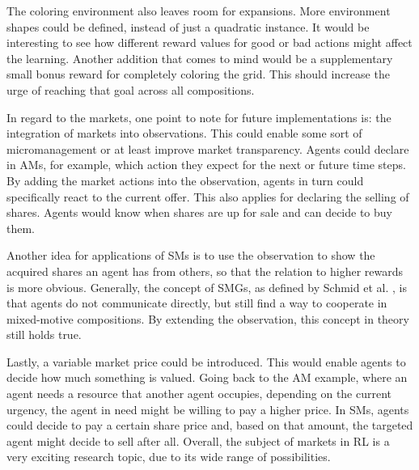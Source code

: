 The coloring environment also leaves room for expansions. More environment shapes could be defined, instead of just a quadratic instance. It would be interesting to see how different reward values for good or bad actions might affect the learning. Another addition that comes to mind would be a supplementary small bonus reward for completely coloring the grid. This should increase the urge of reaching that goal across all compositions.

In regard to the markets, one point to note for future implementations is: the integration of markets into observations. This could enable some sort of micromanagement or at least improve market transparency. Agents could declare in AMs, for example, which action they expect for the next or future time steps. By adding the market actions into the observation, agents in turn could specifically react to the current offer. This also applies for declaring the selling of shares. Agents would know when shares are up for sale and can decide to buy them. 

Another idea for applications of SMs is to use the observation to show the acquired shares an agent has from others, so that the relation to higher rewards is more obvious. Generally, the concept of SMGs, as defined by Schmid et al. \cite{scbe21}, is that agents do not communicate directly, but still find a way to cooperate in mixed-motive compositions. By extending the observation, this concept in theory still holds true.

Lastly, a variable market price could be introduced. This would enable agents to decide how much something is valued. Going back to the AM example, where an agent needs a resource that another agent occupies, depending on the current urgency, the agent in need might be willing to pay a higher price. In SMs, agents could decide to pay a certain share price and, based on that amount, the targeted agent might decide to sell after all. Overall, the subject of markets in RL is a very exciting research topic, due to its wide range of possibilities.